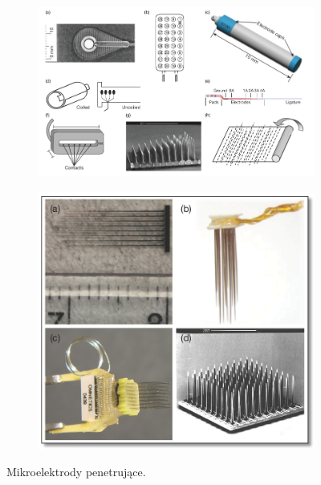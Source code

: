 \documentclass[8pt]{beamer}
\begin{document}
		\begin{frame}
		\begin{figure}
				\begin{center}
        			\begin{subfigure}[b]{0.6\textwidth}
                		\includegraphics[width=\textwidth]{graphics/elektrode.png}
                		\label{graph:g5}
        			\end{subfigure}%
        			\begin{subfigure}[b]{0.4\textwidth}
                		\includegraphics[width=\textwidth]{graphics/elektrode2.png}
                		\label{graph:g6}
        			\end{subfigure}%
				\caption{Mikroelektrody penetrujące. \cite{tenore} }
				\end{center}
			\end{figure}
		\end{frame}		
		
\end{document}
